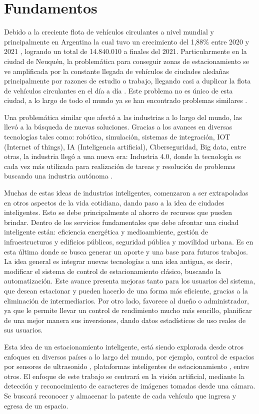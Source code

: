 \section{Fundamentos}

Debido a la creciente flota de vehículos circulantes a nivel mundial y principalmente en Argentina la cual tuvo un crecimiento del 1,88\% entre 2020 y 2021 \cite{asociacion_de_fabricas_argentinas_de_componentes_flota_2021}, logrando un total de 14.840.010 a finales del 2021. Particularmente en la ciudad de Neuquén, la problemática para conseguir zonas de estacionamiento se ve amplificada por la constante llegada de vehículos de ciudades aledañas principalmente por razones de estudio o trabajo, llegando casi a duplicar la flota de vehículos circulantes en el día a día \cite{calalesina_imposible_nodate}. Este problema no es único de esta ciudad, a lo largo de todo el mundo ya se han encontrado problemas similares \cite{20minutos_falta_2018, ibrahim_car_2017}.

Una problemática similar que afectó a las industrias a lo largo del mundo, las llevó a la búsqueda de nuevas soluciones. Gracias a los avances  en diversas tecnologías tales como: robótica, simulación, sistemas de integración, IOT (Internet of things), IA (Inteligencia artificial), Ciberseguridad, Big data, entre otras, la industria llegó a una nueva era: Industria 4.0, donde la tecnología es cada vez más utilizada para realización de tareas y resolución de problemas buscando una industria autónoma \cite{basco_industria_2018}.

Muchas de estas ideas de industrias inteligentes, comenzaron a ser extrapoladas en otros aspectos de la vida cotidiana, dando paso a la idea de ciudades inteligentes. Esto se debe principalmente al ahorro de recursos que pueden brindar. Dentro de los servicios fundamentales que debe afrontar una ciudad inteligente están: eficiencia energética y medioambiente, gestión de infraestructuras y edificios públicos, seguridad pública y movilidad urbana. Es en esta última  donde se busca generar un aporte y una base para futuros trabajos. La idea general es integrar nuevas tecnologías a una idea antigua, es decir, modificar el sistema de control de estacionamiento clásico, buscando la automatización. Este avance presenta mejoras tanto para los usuarios del sistema, que desean estacionar y pueden hacerlo de una forma más eficiente, gracias a la eliminación de intermediarios.
Por otro lado, favorece al dueño o administrador, ya que le permite llevar un control de rendimiento mucho más sencillo, planificar de una mejor manera sus inversiones, dando datos estadísticos de uso reales de sus usuarios.

Esta idea de un estacionamiento inteligente, está siendo explorada desde otros enfoques en diversos países a lo largo del mundo, por ejemplo, control de espacios por sensores de ultrasonido \cite{rivera_arroyave_smartparkudea_2021}, plataformas inteligentes de estacionamiento \cite{formoso_parkit_2014}, entre otros.
El enfoque de este trabajo se centrará en la visión artificial, mediante la detección y reconocimiento de caracteres de imágenes tomadas desde una cámara. Se buscará reconocer y almacenar la patente de cada vehículo que ingresa y egresa de un espacio.
